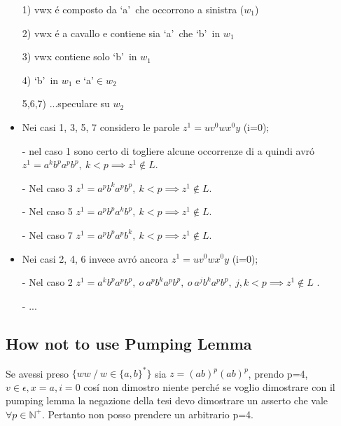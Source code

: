 \begin{itemize}
\item[1)] vwx \'e composto da \lq a\rq\ che occorrono a sinistra ($w_1$)\\
\item[2)] vwx \'e a cavallo e contiene sia \lq a\rq\ che \lq b\rq\ in $w_1$\\
\item[3)] vwx contiene solo \lq b\rq\ in $w_1$\\
\item[4)] \lq b\rq\ in $w_1$ e \lq a\rq $\in w_2$\\
\item[5,6,7)] ...speculare su $w_2$\\
\end{itemize} 
\begin{itemize}
	\item Nei casi 1, 3, 5, 7 considero le parole $z^1=uv^0wx^0y$ (i=0);\\
	\item[-] nel caso 1 sono certo di togliere alcune occorrenze di a quindi avr\'o $z^1 = a^k b^p a^p b^p,\ k < p \implies z^1 \not\in L$. \\
	\item[-] Nel caso 3 $z^1 = a^p b^k a^p b^p,\ k < p \implies z^1 \not\in L$.\\
	\item[-] Nel caso 5 $z^1 = a^p b^p a^k b^p,\ k < p \implies z^1 \not\in L$.\\
	\item[-] Nel caso 7 $z^1 = a^p b^p a^p b^k,\ k < p \implies z^1 \not\in L$.\\
	\item Nei casi 2, 4, 6 invece avr\'o ancora $ z^1=uv^0wx^0y $ (i=0);\\
	\item[-] Nel caso 2 $z^1 = a^k b^p a^p b^p,\ o\ a^p b^k a^p b^p,\ o\ a^j b^k a^p b^p,\ j,k < p \implies z^1 \not\in L$ .\\
	\item[-] ...\\
\end{itemize}

\subsection{How not to use Pumping Lemma}
Se avessi preso $\{ww \ / \ w\in\{a,b\}^*\}$ sia $z = (ab)^p (ab)^p$, prendo p=4, $v\in\epsilon, x=a, i = 0$ cos\'i non 
dimostro niente perch\'e se voglio dimostrare con il pumping lemma la negazione della tesi devo dimostrare un asserto che vale $\forall p \in \mathbb{N}^+$.
Pertanto non posso prendere un arbitrario p=4.


